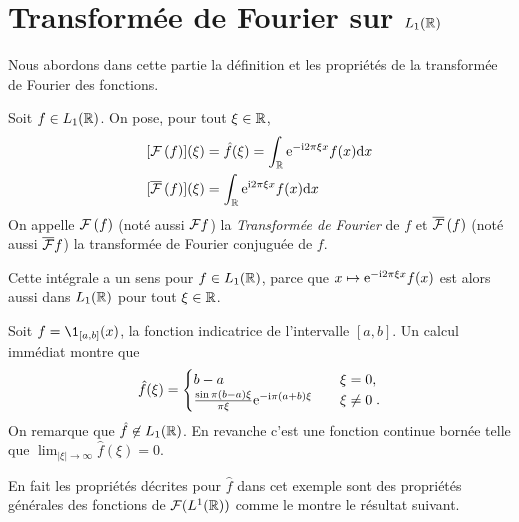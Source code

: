
\section{Transform{\'e}e de Fourier sur $L_1(\mathbb{R})$}

Nous abordons dans cette partie la d{\'e}finition et les propri{\'e}t{\'e}s de la transform{\'e}e de Fourier des fonctions.
\begin{definition}
Soit $f \in L_1(\mathbb{R})$. On pose, pour tout $\xi\in\mathbb{R}$,
\begin{align}
\label{eq:TFL1}
&[\mathcal{F}\left( f \right)](\xi)= \hat{f}(\xi) = \int_{\mathbb{R}} \mathrm{e}^{- \mathrm{i} 2 \pi \xi x} f(x) \mathrm{d} x \\
&[\overline{\mathcal{F}}\left( f \right)](\xi) = \int_{\mathbb{R}} \mathrm{e}^{ \mathrm{i} 2 \pi \xi x} f(x) \mathrm{d} x
\end{align}
On appelle $\mathcal{F}\left( f \right)$ (not{\'e} aussi $\mathcal{F} f$) la \emph{Transform{\'e}e de Fourier} de $f$ et $\overline{\mathcal{F}}\left( f \right)$  (not{\'e} aussi $\overline{\mathcal{F}} f$) la
transform{\'e}e de Fourier conjugu{\'e}e de $f$.
\end{definition}
Cette int{\'e}grale a un sens pour $f \in L_1(\mathbb{R})$, parce que $x\mapsto \mathrm{e}^{- \mathrm{i} 2 \pi \xi x} f(x)$ est alors aussi dans
$L_1(\mathbb{R})$ pour tout $\xi\in\mathbb{R}$.
\begin{example}
Soit $f = \1_{[a,b]}(x)$, la fonction indicatrice de l'intervalle $[a,b]$. Un calcul imm{\'e}diat montre que
$$
\hat{f}(\xi) =
\begin{cases}
b-a & \quad \xi = 0, \\
\frac{\sin \pi (b-a) \xi}{\pi \xi} \mathrm{e}^{- \mathrm{i} \pi (a+b) \xi} & \quad \xi\neq0\;.
\end{cases}
$$
On remarque que $\hat{f} \not \in L_1(\mathbb{R})$. En revanche c'est une fonction continue born{\'e}e
telle que $\lim_{|\xi|\to \infty} \hat{f}(\xi)= 0$.
\end{example}
En fait les propri{\'e}t{\'e}s d{\'e}crites pour $\hat{f}$ dans cet exemple sont des propri{\'e}t{\'e}s g{\'e}n{\'e}rales des
fonctions de $\mathcal{F}(L^1(\mathbb{R}))$ comme le montre le r{\'e}sultat suivant.

